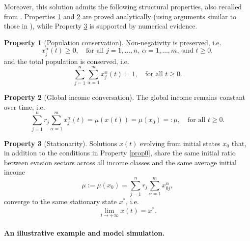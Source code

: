 \documentclass[11pt]{article}
\theoremstyle{plain}
\theoremstyle{definition}
\newtheorem{property}{Property}
\newcommand{\1}{\mathbf{1}}
\begin{document}
Moreover, this solution admits the following structural properties, also recalled from \cite{bertotti2018mathematical}. Properties \ref{prop1} and \ref{prop2}  are proved analytically (using arguments similar to those in \cite{BERTOTTI2010}), while Property \ref{prop3} is supported by numerical evidence.

\begin{property}[Population conservation]
\label{prop1}
Non-negativity is preserved, i.e.
\begin{equation*}
    x_j^\alpha(t) \geq 0, \quad \text{for all } j=1,\ldots,n, \ \alpha=1,\ldots,m, \text{ and } t \geq 0,
\end{equation*}
and the total population is conserved, i.e.
\begin{equation*}
\sum_{j=1}^{n}\sum_{\alpha=1}^{m} x_j^\alpha(t) = 1, \quad \text{for all } t \geq 0. 
\end{equation*}
\end{property}

\begin{property}[Global income conversation]
\label{prop2}
The global income remains constant over time, i.e.
\begin{equation*}
    \sum_{j=1}^{n} r_j \sum_{\alpha=1}^{m} x_j^\alpha(t)=\mu(x(t)) = \mu(x_0)=:\mu, \quad \text{for all } t \geq 0.
\end{equation*}
\end{property}

\begin{property}[Stationarity]
\label{prop3}
Solutions $x(t)$ evolving from initial states $x_0$ that, in addition to the conditions in Property \ref{prop0}, share the same initial ratio between evasion sectors across all income classes
and the same average initial income
\begin{equation*}
   \mu:=\mu(x_0)=\sum_{j=1}^{n} r_j \sum_{\alpha=1}^{m} x_{0j}^\alpha,
\end{equation*}
converge to the same stationary state $x^*$, i.e.
\begin{equation*}
    \lim\limits_{t \to +\infty} x(t)=x^*. 
\end{equation*}
\end{property}

\paragraph{An illustrative example and model simulation.}
\end{document}
